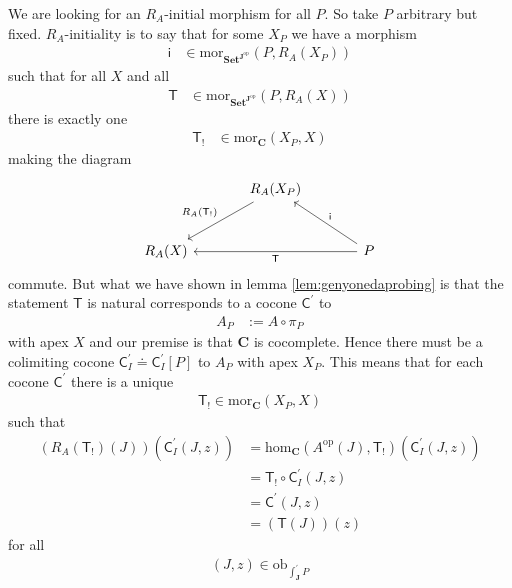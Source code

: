 \begin{prf}
We are looking for an $R_{A}$-initial morphism for all $P$. So take $P$ arbitrary but fixed. $R_{A}$-initiality is to say that for some $X_{P}$ we have a morphism
\begin{align*}
  \mathsf{i}
  &\in
  \mathrm{mor}_{\mathbf{Set}^{\mathbf{J}^{\textrm{op}}}}(P,R_{A}(X_{P}))
\end{align*}
such that for all $X$ and all
\begin{align*}
  \mathsf{T}
  &\in
  \mathrm{mor}_{\mathbf{Set}^{\mathbf{J}^{\textrm{op}}}}(P,R_{A}(X))
\end{align*}
there is exactly one
\begin{align*}
  \mathsf{T}_{!}
  &\in
  \mathrm{mor}_{\mathbf{C}}(X_{P},X)
\end{align*}
making the diagram
\[
\begin{tikzcd}[sep=large]
  &
  R_{A}(X_{P})
  \arrow[swap]{dl}{R_{A}(\mathsf{T}_{!})}
  &
  \\
  R_{A}(X)
  &
  &
  P
  \arrow{ll}{\mathsf{T}}
  \arrow[swap]{lu}{\mathsf{i}}
\end{tikzcd}
\]
commute. But what we have shown in lemma \ref{lem:genyonedaprobing} is that the statement {\glqq}$\mathsf{T}$ is natural{\grqq} corresponds to a cocone $\mathsf{C}^{\prime}$ to
\begin{align*}
  A_{P}
  &:=
  A
  \circ
  \pi_{P}
\end{align*}
with apex $X$ and our premise is that $\mathbf{C}$ is cocomplete. Hence there must be a colimiting cocone $\mathsf{C}_{I}^{\prime} \doteq \mathsf{C}_{I}^{\prime}[P]$ to $A_{P}$ with apex $X_{P}$. This means that for each cocone $\mathsf{C}^{\prime}$ there is a unique
\begin{align*}
  \mathsf{T}_{!}
  \in
  \mathrm{mor}_{\mathbf{C}}(X_{P},X)
\end{align*}
such that
\begin{align*}
  \left(
    R_{A}(\mathsf{T}_{!})(J)
  \right)
  \left(
    \mathsf{C}_{I}^{\prime}(J,z)
  \right)
  &=
  \mathrm{hom}_{\mathbf{C}}(A^{\textrm{op}}(J),\mathsf{T}_{!})
  \left(
    \mathsf{C}_{I}^{\prime}(J,z)
  \right)
  \\
  &=
  \mathsf{T}_{!}
  \circ
  \mathsf{C}_{I}^{\prime}(J,z)
  \\
  &=
  \mathsf{C}^{\prime}(J,z)
  \\
  &=
  (\mathsf{T}(J))(z)
\end{align*}
for all
\begin{align*}
  (J,z)
  \in
  \mathrm{ob}_{\int_{\mathbf{J}}^{\prime}P}

\end{align*}
\end{prf}
